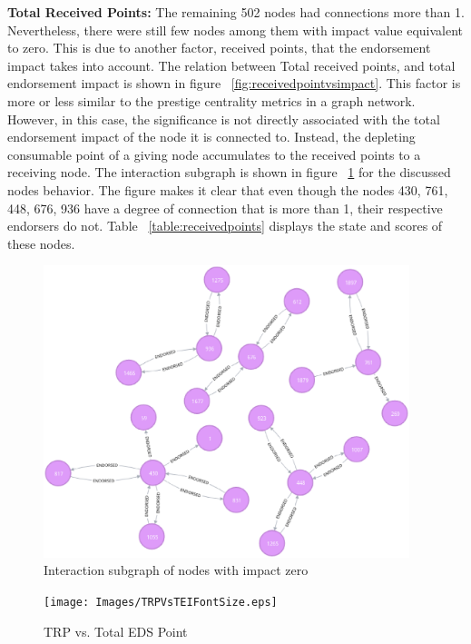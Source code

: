 \textbf{Total Received Points:}
The remaining 502 nodes had connections more than 1. Nevertheless, there were
still few nodes among them with impact value equivalent to zero. This is due to
another factor, received points, that the endorsement impact takes into
account. The relation between Total received points, and total endorsement
impact is shown in figure ~\ref{fig:receivedpointvsimpact}. This factor is more
or less similar to the prestige centrality metrics in a graph network. However,
in this case, the significance is not directly associated with the total
endorsement impact of the node it is connected to. Instead, the depleting
consumable point of a giving node accumulates to the received points to a
receiving node. The interaction subgraph is shown in figure
~\ref{fig:zeroimpact} for the discussed nodes behavior. The figure makes it
clear that even though the nodes 430, 761, 448, 676, 936 have a degree of
connection that is more than 1, their respective endorsers do not. Table
~\ref{table:receivedpoints} displays the state and scores of these nodes. 
\begin{figure}
	\includegraphics[width=0.95\textwidth]{Images/nodesWithImpactZero.eps}
	\caption{Interaction subgraph of nodes with impact zero}
	\label{fig:zeroimpact}
\end{figure}

\begin{figure}
	\texttt{[image: Images/TRPVsTEIFontSize.eps]}
	\caption{TRP vs. Total EDS Point}
	\label{fig:receivedpointsvsimpact}
\end{figure}


